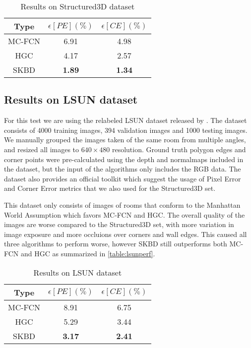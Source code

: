 \begin{table}[H]
\centering
\begin{tabular}{|c | c c |}
    \hline
    Type & $\epsilon[PE](\%)$ & $\epsilon[CE](\%)$ \\ [0.5 ex]
    \hline\hline
    MC-FCN & 6.91 & 4.98 \\
    HGC & 4.17 & 2.57 \\
    \hline
    SKBD & \textbf{1.89} & \textbf{1.34} \\
    \hline
\end{tabular}
\caption{Results on Structured3D dataset}
\label{table:structured3dperf}
\end{table}


\subsection{Results on LSUN dataset}
For this test we are using the relabeled LSUN dataset released by \cite{ren2017coarse}. The dataset consists of 4000 training images, 394 validation images and 1000 testing images. We manually grouped the images taken of the same room from multiple angles, and resized all images to \( 640 \times 480 \) resolution. Ground truth polygon edges and corner points were pre-calculated using the depth and normalmaps included in the dataset, but the input of the algorithms only includes the RGB data. The dataset also provides an official toolkit which suggest the usage of Pixel Error and Corner Error metrics that we also used for the Structured3D set.

This dataset only consists of images of rooms that conform to the Manhattan World Assumption\cite{790349} which favors MC-FCN and HGC. The overall quality of the images are worse compared to the Structured3D set, with more variation in image exposure and more occluions over corners and wall edges. This caused all three algorithms to perform worse, however SKBD still outperforms both MC-FCN and HGC as summarized in \autoref{table:lsunperf}.

\begin{table}[H]
\centering
\begin{tabular}{|c | c c |}
    \hline
    Type & $\epsilon[PE](\%)$ & $\epsilon[CE](\%)$ \\ [0.5 ex]
    \hline\hline
    MC-FCN & 8.91 & 6.75 \\
    HGC & 5.29 & 3.44 \\
    \hline
    SKBD & \textbf{3.17} & \textbf{2.41} \\
    \hline
\end{tabular}
\caption{Results on LSUN dataset}
\label{table:lsunperf}
\end{table}



